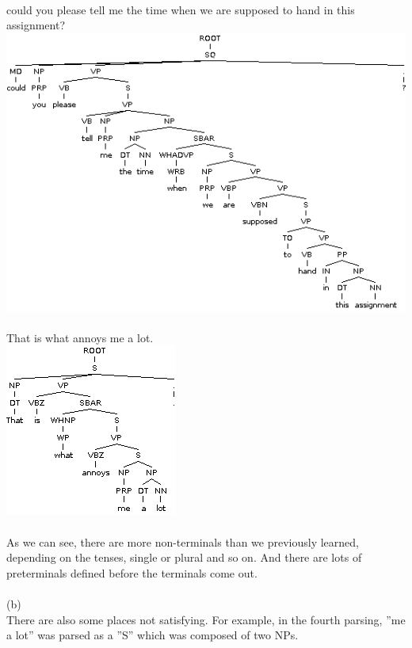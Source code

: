 \documentclass[11pt]{article}
\begin{document}
\\
could you please tell me the time when we are supposed to hand in this assignment?\\
\includegraphics[width=0.8\linewidth]{parse3.png}\\
\\
That is what annoys me a lot.\\
\includegraphics[width=0.8\linewidth]{parse4.png}\\
\\
As we can see, there are more non-terminals than we previously learned, depending on the tenses, single or plural and so on. 
And there are lots of preterminals defined before the terminals come out.\\
\\
(b)\\
There are also some places not satisfying. For example, in the fourth parsing, ''me a lot'' was parsed as a ''S'' which was composed of two NPs.\\
\end{document}
